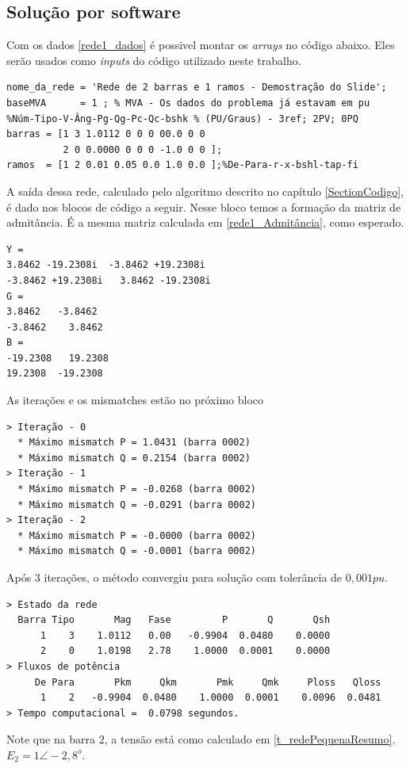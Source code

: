 \subsection{Solução por software}
Com os dados \ref{rede1_dados} é possivel montar os \textit{arrays} no código abaixo. Eles serão usados como \textit{inputs} do código utilizado neste trabalho. 
\begin{verbatim}
nome_da_rede = 'Rede de 2 barras e 1 ramos - Demostração do Slide';
baseMVA      = 1 ; % MVA - Os dados do problema já estavam em pu
%Núm-Tipo-V-Âng-Pg-Qg-Pc-Qc-bshk % (PU/Graus) - 3ref; 2PV; 0PQ
barras = [1 3 1.0112 0 0 0 00.0 0 0
          2 0 0.0000 0 0 0 -1.0 0 0 ];
ramos  = [1 2 0.01 0.05 0.0 1.0 0.0 ];%De-Para-r-x-bshl-tap-fi
\end{verbatim}
A saída dessa rede, calculado pelo algoritmo descrito no capítulo \ref{SectionCodigo}, é dado nos blocos de código a seguir.
Nesse bloco temos a formação da matriz de admitância. É a mesma matriz calculada em \ref{rede1_Admitância}, como esperado.
\begin{verbatim}
Y =
3.8462 -19.2308i  -3.8462 +19.2308i
-3.8462 +19.2308i   3.8462 -19.2308i
G =
3.8462   -3.8462
-3.8462    3.8462
B =
-19.2308   19.2308
19.2308  -19.2308
\end{verbatim}
As iterações e os mismatches estão no próximo bloco
\begin{verbatim}
> Iteração - 0
  * Máximo mismatch P = 1.0431 (barra 0002)
  * Máximo mismatch Q = 0.2154 (barra 0002)
> Iteração - 1
  * Máximo mismatch P = -0.0268 (barra 0002)
  * Máximo mismatch Q = -0.0291 (barra 0002)
> Iteração - 2
  * Máximo mismatch P = -0.0000 (barra 0002)
  * Máximo mismatch Q = -0.0001 (barra 0002)
\end{verbatim}
Após 3 iterações, o método convergiu para solução com tolerância de $0,001pu$.
\begin{verbatim}
> Estado da rede
  Barra Tipo       Mag   Fase         P       Q       Qsh
      1    3    1.0112   0.00   -0.9904  0.0480    0.0000 
      2    0    1.0198   2.78    1.0000  0.0001    0.0000 
> Fluxos de potência
     De Para       Pkm     Qkm       Pmk     Qmk     Ploss   Qloss
      1    2   -0.9904  0.0480    1.0000  0.0001    0.0096  0.0481
> Tempo computacional =  0.0798 segundos.
\end{verbatim}
Note que na barra $2$, a tensão está como calculado em \ref{t_redePequenaResumo}. $E_2=1 \angle -2,8^o$.



